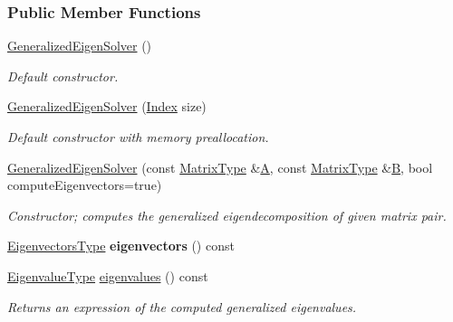 \subsubsection*{Public Member Functions}
\begin{DoxyCompactItemize}
\item 
\hyperlink{group___eigenvalues___module_ae745f39da43f9df192cc2875d82b4cf1}{Generalized\+Eigen\+Solver} ()
\begin{DoxyCompactList}\small\item\em Default constructor. \end{DoxyCompactList}\item 
\hyperlink{group___eigenvalues___module_aab6423ded30275cd4cdd31758c278694}{Generalized\+Eigen\+Solver} (\hyperlink{group___eigenvalues___module_a46a0ff3841059479ec314e56a5645302}{Index} size)
\begin{DoxyCompactList}\small\item\em Default constructor with memory preallocation. \end{DoxyCompactList}\item 
\hyperlink{group___eigenvalues___module_a2a3528cbf75f66d3a60af9dc7b12ff65}{Generalized\+Eigen\+Solver} (const \hyperlink{group___eigenvalues___module_a56f4b9823bb9a267de3aaf48428cd247}{Matrix\+Type} \&\hyperlink{group___core___module_class_eigen_1_1_matrix}{A}, const \hyperlink{group___eigenvalues___module_a56f4b9823bb9a267de3aaf48428cd247}{Matrix\+Type} \&\hyperlink{group___core___module_class_eigen_1_1_matrix}{B}, bool compute\+Eigenvectors=true)
\begin{DoxyCompactList}\small\item\em Constructor; computes the generalized eigendecomposition of given matrix pair. \end{DoxyCompactList}\item 
\mbox{\label{group___eigenvalues___module_a33a89a59e7e49f0752c55f6c6cb65754}} 
\hyperlink{group___eigenvalues___module_afffec018dbb2d87b4c09b6acecbb79cd}{Eigenvectors\+Type} {\bfseries eigenvectors} () const
\item 
\hyperlink{group___eigenvalues___module_ad59af178acc401f1bc4e330ef80f286d}{Eigenvalue\+Type} \hyperlink{group___eigenvalues___module_a62f01cd78271efd5e39bcb24e0fe1a58}{eigenvalues} () const
\begin{DoxyCompactList}\small\item\em Returns an expression of the computed generalized eigenvalues. \end{DoxyCompactList}\item 

\end{DoxyCompactItemize}
